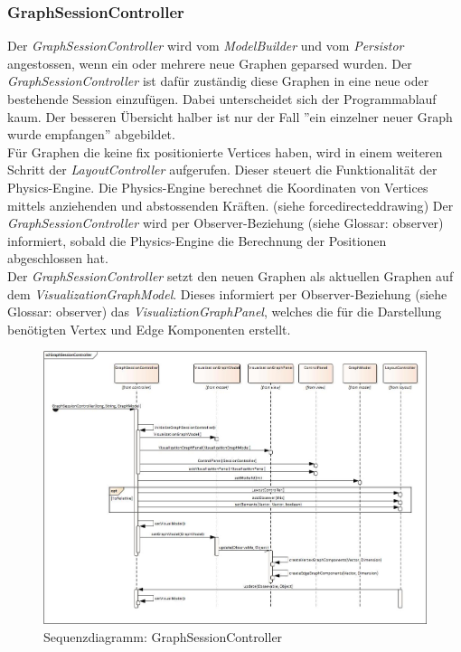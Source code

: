 \documentclass[11pt,a4paper,english,oneside]{book}
\numberwithin{equation}{chapter}
\begin{document}
	\subsubsection{GraphSessionController} \label{sssec:sessioncontroller}
	Der \textit{GraphSessionController} wird vom \textit{ModelBuilder} und vom \textit{Persistor} angestossen, wenn ein oder mehrere neue Graphen geparsed wurden. Der \textit{GraphSessionController} ist dafür zuständig diese Graphen in eine neue oder bestehende Session einzufügen. Dabei unterscheidet sich der Programmablauf kaum. Der besseren Übersicht halber ist nur der Fall ''ein einzelner neuer Graph wurde empfangen'' abgebildet.\\
	Für Graphen die keine fix positionierte Vertices haben, wird in einem weiteren Schritt der \textit{LayoutController} aufgerufen. Dieser steuert die Funktionalität der Physics-Engine. Die Physics-Engine berechnet die Koordinaten von Vertices mittels anziehenden und abstossenden Kräften. (siehe \gls{forcedirecteddrawing}) Der \textit{GraphSessionController} wird  per Observer-Beziehung (siehe Glossar: \gls{observer}) informiert, sobald die Physics-Engine die Berechnung der Positionen abgeschlossen hat.\\
	Der \textit{GraphSessionController} setzt den neuen Graphen als aktuellen Graphen auf dem \textit{VisualizationGraphModel}. Dieses informiert per Observer-Beziehung (siehe Glossar: \gls{observer}) das \textit{VisualiztionGraphPanel}, welches die für die Darstellung benötigten Vertex und Edge Komponenten erstellt.
	\begin{figure}[h!]
		\centering
		\includegraphics[width=\linewidth]{assets/images/graph_session_controller}
		\caption{Sequenzdiagramm: GraphSessionController}
		\label{fig:sd-graphsessioncontroller}
	\end{figure}
	
\end{document}
